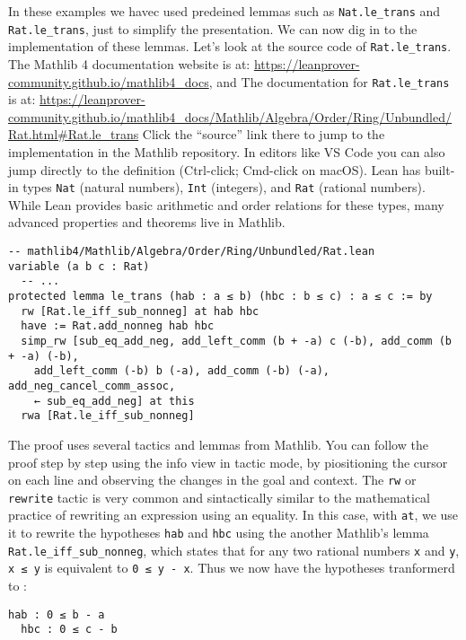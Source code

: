 In these examples we havec used predeined lemmas such as 
\lstinline[language=lean]|Nat.le_trans| and
\lstinline[language=lean]|Rat.le_trans|, just to simplify the presentation.
We can now dig in to the implementation of these lemmas.
Let’s look at the source code of \lstinline[language=lean]|Rat.le_trans|.
The Mathlib 4 documentation website is at:
\url{https://leanprover-community.github.io/mathlib4_docs}, and
The documentation for 
\lstinline[language=lean]|Rat.le_trans| is at:
\url{https://leanprover-community.github.io/mathlib4_docs/Mathlib/Algebra/Order/Ring/Unbundled/Rat.html#Rat.le_trans}
Click the “source” link there to jump to the implementation in the Mathlib repository. In editors like 
VS Code you can also jump directly to the definition (Ctrl-click; Cmd-click on macOS).
Lean has built-in types \texttt{Nat} (natural numbers), \texttt{Int} (integers), 
and \texttt{Rat} (rational numbers). While Lean provides basic arithmetic and 
order relations for these types, many advanced properties and theorems live in Mathlib.
\begin{lstlisting}[language=lean]
  -- mathlib4/Mathlib/Algebra/Order/Ring/Unbundled/Rat.lean
variable (a b c : Rat)
  -- ...
protected lemma le_trans (hab : a ≤ b) (hbc : b ≤ c) : a ≤ c := by
  rw [Rat.le_iff_sub_nonneg] at hab hbc
  have := Rat.add_nonneg hab hbc
  simp_rw [sub_eq_add_neg, add_left_comm (b + -a) c (-b), add_comm (b + -a) (-b),
    add_left_comm (-b) b (-a), add_comm (-b) (-a), add_neg_cancel_comm_assoc,
    ← sub_eq_add_neg] at this
  rwa [Rat.le_iff_sub_nonneg]
\end{lstlisting}
The proof uses several tactics and lemmas from Mathlib. You can follow 
the proof step by step using the info view in tactic mode, by piositioning the cursor
on each line and observing the changes in the goal and context.
The \lstinline[language=lean]|rw| or \lstinline[language=lean]|rewrite| tactic  
is very common and sintactically similar to
the mathematical practice of rewriting an expression using an equality.
In this case, with \lstinline[language=lean]|at|, we use it to rewrite the 
hypotheses \lstinline[language=lean]|hab| 
and \lstinline[language=lean]|hbc|
using the another Mathlib's lemma \lstinline[language=lean]|Rat.le_iff_sub_nonneg|, 
which states that for any two rational numbers \lstinline[language=lean]|x| and
\lstinline[language=lean]|y|, \lstinline[language=lean]|x ≤ y| 
is equivalent to \lstinline[language=lean]|0 ≤ y - x|.
Thus we now have the hypotheses tranformerd to :  
\begin{lstlisting}[language=lean]
  hab : 0 ≤ b - a
  hbc : 0 ≤ c - b
\end{lstlisting}
